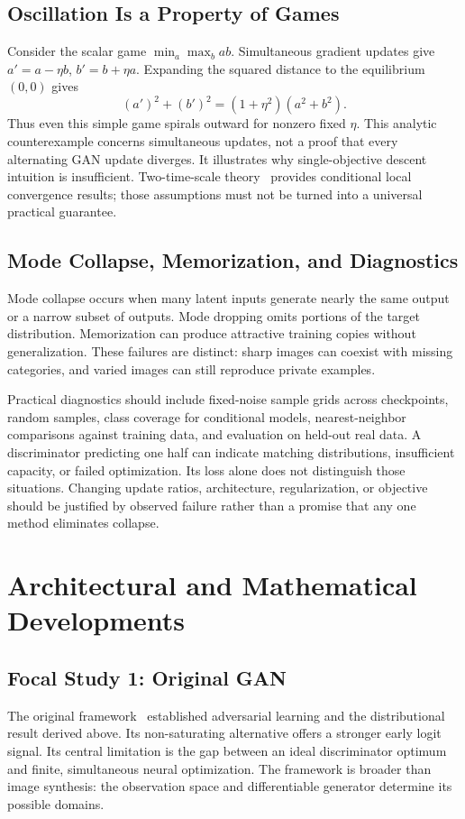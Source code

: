 \documentclass[conference]{IEEEtran}
\begin{document}
\subsection{Oscillation Is a Property of Games}
Consider the scalar game $\min_a\max_b ab$. Simultaneous gradient updates give $a'=a-\eta b$, $b'=b+\eta a$. Expanding the squared distance to the equilibrium $(0,0)$ gives
\begin{equation}
(a')^2+(b')^2=(1+\eta^2)(a^2+b^2).
\end{equation}
Thus even this simple game spirals outward for nonzero fixed $\eta$. This analytic counterexample concerns simultaneous updates, not a proof that every alternating GAN update diverges. It illustrates why single-objective descent intuition is insufficient. Two-time-scale theory~\cite{fid} provides conditional local convergence results; those assumptions must not be turned into a universal practical guarantee.

\subsection{Mode Collapse, Memorization, and Diagnostics}
Mode collapse occurs when many latent inputs generate nearly the same output or a narrow subset of outputs. Mode dropping omits portions of the target distribution. Memorization can produce attractive training copies without generalization. These failures are distinct: sharp images can coexist with missing categories, and varied images can still reproduce private examples.

Practical diagnostics should include fixed-noise sample grids across checkpoints, random samples, class coverage for conditional models, nearest-neighbor comparisons against training data, and evaluation on held-out real data. A discriminator predicting one half can indicate matching distributions, insufficient capacity, or failed optimization. Its loss alone does not distinguish those situations. Changing update ratios, architecture, regularization, or objective should be justified by observed failure rather than a promise that any one method eliminates collapse.

\section{Architectural and Mathematical Developments}
\subsection{Focal Study 1: Original GAN}
The original framework~\cite{gan} established adversarial learning and the distributional result derived above. Its non-saturating alternative offers a stronger early logit signal. Its central limitation is the gap between an ideal discriminator optimum and finite, simultaneous neural optimization. The framework is broader than image synthesis: the observation space and differentiable generator determine its possible domains.
\end{document}
